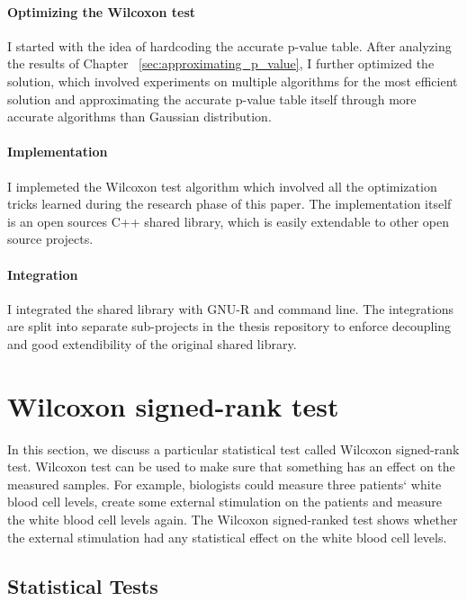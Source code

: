 \documentclass[12pt]{article}
\begin{document}
{\paragraph{Optimizing the Wilcoxon test\\}
I started with the idea of hardcoding the accurate p-value table. After analyzing the results of Chapter ~\ref{sec:approximating_p_value}, I further optimized the solution, which involved experiments on multiple algorithms for the most efficient solution and approximating the accurate p-value table itself through more accurate algorithms than Gaussian distribution.

\paragraph{Implementation\\}
I implemeted the Wilcoxon test algorithm which involved all the optimization tricks learned during the research phase of this paper. The implementation itself is an open sources C++ shared library, which is easily extendable to other open source projects.

\paragraph{Integration\\}
I integrated the shared library with GNU-R and command line. The integrations are split into separate sub-projects in the thesis repository to enforce decoupling and good extendibility of the original shared library.

\newpage

\section{Wilcoxon signed-rank test}

In this section, we discuss a particular statistical test called Wilcoxon signed-rank test. Wilcoxon test can be used to make sure that something has an effect on the measured samples. For example, biologists could measure three patients` white blood cell levels, create some external stimulation on the patients and measure the white blood cell levels again. The Wilcoxon signed-ranked test shows whether the external stimulation had any statistical effect on the white blood cell levels.
\subsection{Statistical Tests}

}
\end{document}
